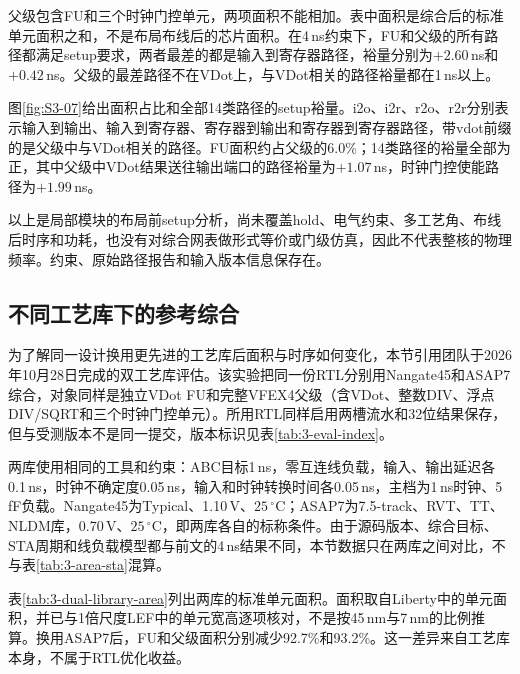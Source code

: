 父级包含FU和三个时钟门控单元，两项面积不能相加。表中面积是综合后的标准单元面积之和，不是布局布线后的芯片面积。在4\,ns约束下，FU和父级的所有路径都满足setup要求，两者最差的都是输入到寄存器路径，裕量分别为$+2.60$\,ns和$+0.42$\,ns。父级的最差路径不在VDot上，与VDot相关的路径裕量都在1\,ns以上。

图\ref{fig:S3-07}给出面积占比和全部14类路径的setup裕量。i2o、i2r、r2o、r2r分别表示输入到输出、输入到寄存器、寄存器到输出和寄存器到寄存器路径，带vdot前缀的是父级中与VDot相关的路径。FU面积约占父级的6.0\%；14类路径的裕量全部为正，其中父级中VDot结果送往输出端口的路径裕量为$+1.07$\,ns，时钟门控使能路径为$+1.99$\,ns。


以上是局部模块的布局前setup分析，尚未覆盖hold、电气约束、多工艺角、布线后时序和功耗，也没有对综合网表做形式等价或门级仿真，因此不代表整核的物理频率。约束、原始路径报告和输入版本信息保存在。

\FloatBarrier


\subsection{不同工艺库下的参考综合}\label{subsec:3-asap7-reference}
为了解同一设计换用更先进的工艺库后面积与时序如何变化，本节引用团队于2026年10月28日完成的双工艺库评估。该实验把同一份RTL分别用Nangate45和ASAP7综合，对象同样是独立VDot FU和完整VFEX4父级（含VDot、整数DIV、浮点DIV/SQRT和三个时钟门控单元）。所用RTL同样启用两槽流水和32位结果保存，但与受测版本不是同一提交，版本标识见表\ref{tab:3-eval-index}。

两库使用相同的工具和约束：ABC目标1\,ns，零互连线负载，输入、输出延迟各0.1\,ns，时钟不确定度0.05\,ns，输入和时钟转换时间各0.05\,ns，主档为1\,ns时钟、5\,fF负载。Nangate45为Typical、1.10\,V、$25\,^{\circ}\mathrm{C}$；ASAP7为7.5-track、RVT、TT、NLDM库，0.70\,V、$25\,^{\circ}\mathrm{C}$，即两库各自的标称条件。由于源码版本、综合目标、STA周期和线负载模型都与前文的4\,ns结果不同，本节数据只在两库之间对比，不与表\ref{tab:3-area-sta}混算。

表\ref{tab:3-dual-library-area}列出两库的标准单元面积。面积取自Liberty中的单元面积，并已与1倍尺度LEF中的单元宽高逐项核对，不是按45\,nm与7\,nm的比例推算。换用ASAP7后，FU和父级面积分别减少92.7\%和93.2\%。这一差异来自工艺库本身，不属于RTL优化收益。

